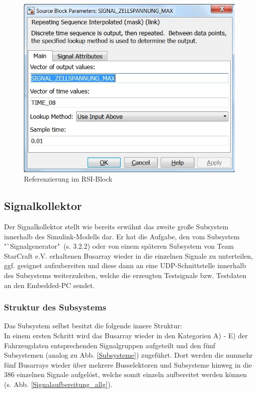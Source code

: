 \documentclass[fontsize = 12pt, paper = a4]{scrreprt}
\begin{document}
\begin{figure}[h]
\centering
\includegraphics[scale = 0.55]{referenz}
\caption[Referenzierung der Config-Datei]{Referenzierung im RSI-Block}
\label{Ref. RSI}
\end{figure}

\newpage

\subsection{Signalkollektor}

Der Signalkollektor stellt wie bereits erwähnt das zweite große Subsystem innerhalb des Simulink-Modells dar. Er hat die Aufgabe, den vom Subsystem "`Signalgenerator"\ (s. 3.2.2) oder von einem späteren Subsystem von Team StarCraft e.V. erhaltenen Busarray wieder in die einzelnen Signale zu unterteilen, ggf. geeignet aufzubereiten und diese dann an eine UDP-Schnittstelle innerhalb des Subsystems weiterzuleiten, welche die erzeugten Testsignale bzw. Testdaten an den Embedded-PC sendet.  

\subsubsection{Struktur des Subsystems}

Das Subsystem selbst besitzt die folgende innere Struktur: \\
In einem ersten Schritt wird das Busarray wieder in den Kategorien A) - E) der Fahrzeugdaten entsprechenden Signalgruppen aufgeteilt und den fünf Subsystemen (analog zu Abb. \ref{Subsysteme}) zugeführt. Dort werden die nunmehr fünf Busarrays wieder über mehrere Busselektoren und Subsysteme hinweg in die 386 einzelnen Signale aufgelöst, welche somit einzeln aufbereitet werden können (s. Abb. \ref{Signalaufbereitung_allg}). \\
\end{document}
